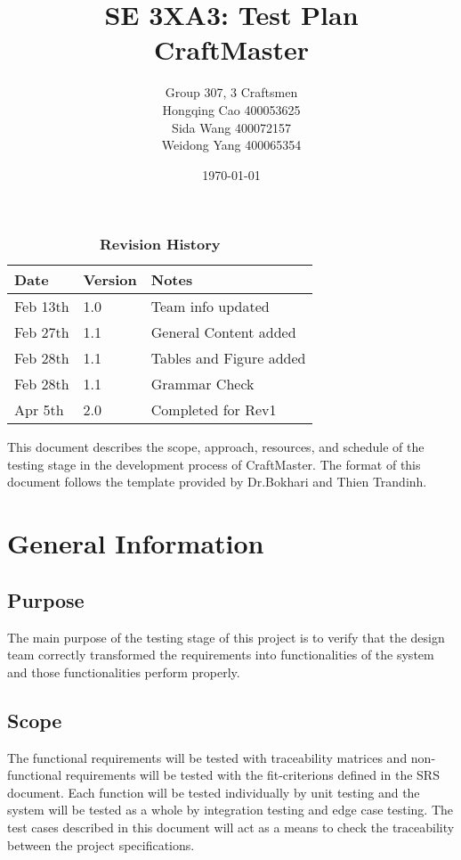 \documentclass[12pt, titlepage]{article}
\title{SE 3XA3: Test Plan\\CraftMaster}
\author{Group 307, 3 Craftsmen\\
		Hongqing Cao 400053625\\
		Sida Wang	 400072157\\
		Weidong Yang 400065354}
\date{\today}
\begin{document}
\maketitle

\tableofcontents
\listoftables
\listoffigures

\begin{table}[bp]
\begin{tabularx}{\textwidth}{p{3cm}p{2cm}X}
\toprule {\bf Date} & {\bf Version} & {\bf Notes}\\
\midrule
Feb 13th & 1.0 & Team info updated\\
Feb 27th & 1.1 & General Content added\\
Feb 28th & 1.1 & Tables and Figure added\\
Feb 28th & 1.1 & Grammar Check\\
Apr 5th & 2.0  & Completed for Rev1\\
\bottomrule
\end{tabularx}
\caption{\bf Revision History}
\end{table}

\newpage


This document describes the scope, approach, resources, and schedule of the testing stage in the development process of CraftMaster. The format of this document follows the template provided by Dr.Bokhari and Thien Trandinh.

\section{General Information}

\subsection{Purpose}
The main purpose of the testing stage of this project is to verify that the design team correctly transformed the requirements into functionalities of the system and those functionalities perform properly.
\subsection{Scope}
The functional requirements will be tested with traceability matrices and non-functional requirements will be tested with the fit-criterions defined in the SRS document. Each function will be tested individually by unit testing and the system will be tested as a whole by integration testing and edge case testing. The test cases described in this document will act as a means to check the traceability between the project specifications.
\end{document}
